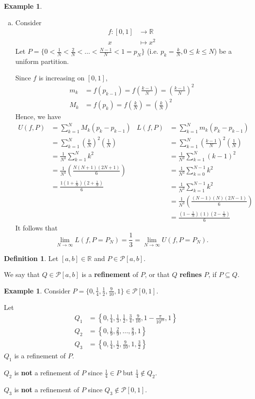 \documentclass[11pt]{article}
\theoremstyle{definition}
\newtheorem{defn}[thm]{Definition}
\newtheorem{exmp}[thm]{Example}
\newcommand{\mbR}{\ensuremath{\mathbb{R}}}
\begin{document}
\begin{exmp}
\begin{enumerate}[(a)]
\item Consider 
\begin{align*}
f : [0, 1] & \to \mbR \\
	   x & \mapsto x^2
\end{align*}
Let $P = \{0 < \frac1N < \frac2N < \hdots < \frac{N-1}N < 1 = p_N\}$ (i.e. $p_k = \frac{k}N, 0 \leq k \leq N$) be a uniform partition. 

Since $f$ is increasing on $[0, 1]$,
\begin{align*}
m_k & = f(p_{k-1}) = f\left(\frac{k-1}N\right) = \left(\frac{k-1}N\right)^2 \\
M_k & = f(p_k) = f\left(\frac{k}N\right) = \left(\frac{k}N\right)^2
\end{align*}
Hence, we have
\begin{align*}
U(f, P) & = \sum_{k=1}^N M_k (p_k - p_{k-1}) & L(f, P) & = \sum_{k=1}^N m_k (p_k - p_{k-1}) \\
& = \sum_{k=1}^N \left(\frac{k}N\right)^2 \left(\frac1N\right) & & = \sum_{k=1}^N \left(\frac{k-1}N\right)^2 \left(\frac1N\right) \\
& = \frac1{N^3} \sum_{k=1}^N k^2 & & = \frac1{N^3} \sum_{k=1}^N (k-1)^2 \\
& = \frac1{N^3} \left(\frac{N(N+1)(2N+1)}6\right) & & = \frac1{N^3} \sum_{k=0}^{N-1} k^2 \\
& = \frac{1(1+\frac1N)(2+\frac1N)}6 & & = \frac1{N^3} \sum_{k=1}^{N-1} k^2 \\
& & & = \frac1{N^3} \left(\frac{(N-1)(N)(2N-1)}6\right) \\
& & & = \frac{(1-\frac1N)(1)(2-\frac1N)}6
\end{align*}
It follows that
$$\lim_{N\to\infty} L(f, P = P_N) = \frac13 = \lim_{N\to\infty} U(f, P = P_N) \text{.}$$

\end{enumerate}
\end{exmp}

\begin{defn}
Let $[a, b] \in \mbR$ and $P \in \mathcal{P}[a, b]$. 

We say that $Q \in \mathcal{P}[a, b]$ is a \textbf{refinement} of $P$, or that $Q$ \textbf{refines} $P$, if $P \subseteq Q$. 
\end{defn}

\begin{exmp}
Consider $P = \{0, \frac14, \frac12, \frac9{10}, 1\} \in \mathcal{P}[0, 1]$. 

Let
\begin{align*}
Q_1 & = \left\{0, \frac14, \frac13, \frac12, \frac34, \frac9{10}, 1 - \frac{\pi}{10^{23}}, 1\right\} \\
Q_2 & = \left\{0, \frac19, \frac29, \hdots, \frac89, 1\right\} \\
Q_3 & = \left\{0, \frac14, \frac12, \frac9{10}, 1, \frac32\right\}
\end{align*}
$Q_1$ is a refinement of $P$. 

$Q_2$ is \textbf{not} a refinement of $P$ since $\frac14 \in P$ but $\frac14 \notin Q_2$. 

$Q_3$ is \textbf{not} a refinement of $P$ since $Q_3 \notin \mathcal{P}[0, 1]$.
\end{exmp}
\end{document}
